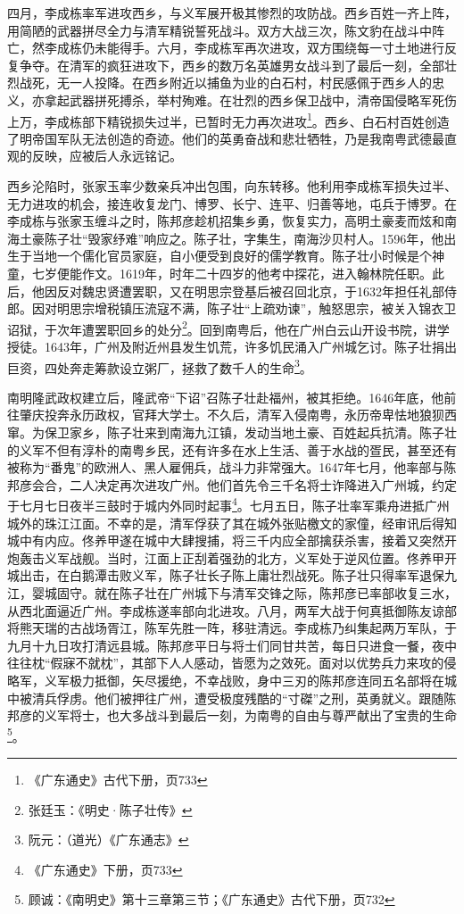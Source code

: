 四月，李成栋率军进攻西乡，与义军展开极其惨烈的攻防战。西乡百姓一齐上阵，用简陋的武器拼尽全力与清军精锐誓死战斗。双方大战三次，陈文豹在战斗中阵亡，然李成栋仍未能得手。六月，李成栋军再次进攻，双方围绕每一寸土地进行反复争夺。在清军的疯狂进攻下，西乡的数万名英雄男女战斗到了最后一刻，全部壮烈战死，无一人投降。在西乡附近以捕鱼为业的白石村，村民感佩于西乡人的忠义，亦拿起武器拼死搏杀，举村殉难。在壮烈的西乡保卫战中，清帝国侵略军死伤上万，李成栋部下精锐损失过半，已暂时无力再次进攻\footnote{《广东通史》古代下册，页733}。西乡、白石村百姓创造了明帝国军队无法创造的奇迹。他们的英勇奋战和悲壮牺牲，乃是我南粤武德最直观的反映，应被后人永远铭记。

西乡沦陷时，张家玉率少数亲兵冲出包围，向东转移。他利用李成栋军损失过半、无力进攻的机会，接连收复龙门、博罗、长宁、连平、归善等地，屯兵于博罗。在李成栋与张家玉缠斗之时，陈邦彦趁机招集乡勇，恢复实力，高明土豪麦而炫和南海土豪陈子壮“毁家纾难”响应之。陈子壮，字集生，南海沙贝村人。1596年，他出生于当地一个儒化官员家庭，自小便受到良好的儒学教育。陈子壮小时候是个神童，七岁便能作文。1619年，时年二十四岁的他考中探花，进入翰林院任职。此后，他因反对魏忠贤遭罢职，又在明思宗登基后被召回北京，于1632年担任礼部侍郎。因对明思宗增税镇压流寇不满，陈子壮“上疏劝谏”，触怒思宗，被关入锦衣卫诏狱，于次年遭罢职回乡的处分\footnote{张廷玉：《明史·陈子壮传》}。回到南粤后，他在广州白云山开设书院，讲学授徒。1643年，广州及附近州县发生饥荒，许多饥民涌入广州城乞讨。陈子壮捐出巨资，四处奔走筹款设立粥厂，拯救了数千人的生命\footnote{阮元：（道光）《广东通志》}。

南明隆武政权建立后，隆武帝“下诏”召陈子壮赴福州，被其拒绝。1646年底，他前往肇庆投奔永历政权，官拜大学士。不久后，清军入侵南粤，永历帝卑怯地狼狈西窜。为保卫家乡，陈子壮来到南海九江镇，发动当地土豪、百姓起兵抗清。陈子壮的义军不但有淳朴的南粤乡民，还有许多在水上生活、善于水战的疍民，甚至还有被称为“番鬼”的欧洲人、黑人雇佣兵，战斗力非常强大。1647年七月，他率部与陈邦彦会合，二人决定再次进攻广州。他们首先令三千名将士诈降进入广州城，约定于七月七日夜半三鼓时于城内外同时起事\footnote{《广东通史》下册，页733}。七月五日，陈子壮率军乘舟进抵广州城外的珠江江面。不幸的是，清军俘获了其在城外张贴檄文的家僮，经审讯后得知城中有内应。佟养甲遂在城中大肆搜捕，将三千内应全部擒获杀害，接着又突然开炮轰击义军战舰。当时，江面上正刮着强劲的北方，义军处于逆风位置。佟养甲开城出击，在白鹅潭击败义军，陈子壮长子陈上庸壮烈战死。陈子壮只得率军退保九江，婴城固守。就在陈子壮在广州城下与清军交锋之际，陈邦彦已率部收复三水，从西北面逼近广州。李成栋遂率部向北进攻。八月，两军大战于何真抵御陈友谅部将熊天瑞的古战场胥江，陈军先胜一阵，移驻清远。李成栋乃纠集起两万军队，于九月十九日攻打清远县城。陈邦彦平日与将士们同甘共苦，每日只进食一餐，夜中往往枕“假寐不就枕”，其部下人人感动，皆愿为之效死。面对以优势兵力来攻的侵略军，义军极力抵御，矢尽援绝，不幸战败，身中三刃的陈邦彦连同五名部将在城中被清兵俘虏。他们被押往广州，遭受极度残酷的“寸磔”之刑，英勇就义。跟随陈邦彦的义军将士，也大多战斗到最后一刻，为南粤的自由与尊严献出了宝贵的生命\footnote{顾诚：《南明史》第十三章第三节；《广东通史》古代下册，页732}。

